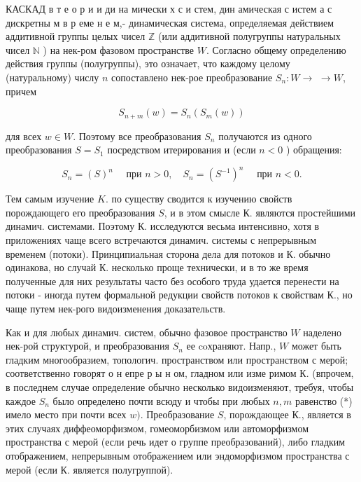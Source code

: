 \documentclass[10pt]{article}
\begin{document}
КАСКАД в т е о р и и ди на мически х с и стем, дин амическая с истем а с дискретны м в р еме н е м,- динамическая система, определяемая действием аддитивной группы целых чисел $\mathbb{Z}$ (или аддитивной полугруппы натуральных чисел $\mathbb{N}$ ) на нек-ром фазовом пространстве $W$. Согласно общему определению действия группы (полугруппы), это означает, что каждому целому (натуральному) числу $n$ сопоставлено нек-рое преобразование $S_{n}: W \rightarrow$ $\rightarrow W$, причем



\[

S_{n+m}(w)=S_{n}\left(S_{m}(w)\right)

\]



для всех $w \in W$. Поэтому все преобразования $S_{n}$ получаются из одного преобразования $S=S_{1}$ посредством итерирования и (если $n<0$ ) обращения:



\[

S_{n}=(S)^{n} \quad \text { при } n>0, \quad S_{n}=\left(S^{-1}\right)^{n} \quad \text { при } n<0 .

\]



Тем самым изучение $K$. по существу сводится к изучению свойств порождающего его преобразования $S$, и в этом смысле К. являются простейшими динамич. системами. Поэтому К. исследуются весьма интенсивно, хотя в приложениях чаще всего встречаются динамич. системы с непрерывным временем (потоки). Принципиальная сторона дела для потоков и $К$. обычно одинакова, но случай К. несколько проще технически, и в то же время полученные для них результаты часто без особого труда удается перенести на потоки - иногда путем формальной редукции свойств потоков к свойствам К., но чаще путем нек-рого видоизменения доказательств.



Как и для любых динамич. систем, обычно фазовое пространство $W$ наделено нек-рой структурой, и преобразования $S_{n}$ ее coхраняют. Напр., $W$ может быть гладким многообразием, топологич. пространством или пространством с мерой; соответственно говорят о н епре р ы н ом, гладном или изме римом К. (впрочем, в последнем случае определение обычно несколько видоизменяют, требуя, чтобы каждое $S_{n}$ было определено почти всюду и чтобы при любых $n, m$ равенство (*) имело место при почти всех $w)$. Преобразование $S$, порождающее К., является в этих случаях диффеоморфизмом, гомеоморбизмом или автоморфизмом пространства с мерой (если речь идет о группе преобразований), либо гладким отображением, непрерывным отображением или эндоморфизмом пространства с мерой (если $К$. является полугруппой).
\end{document}
